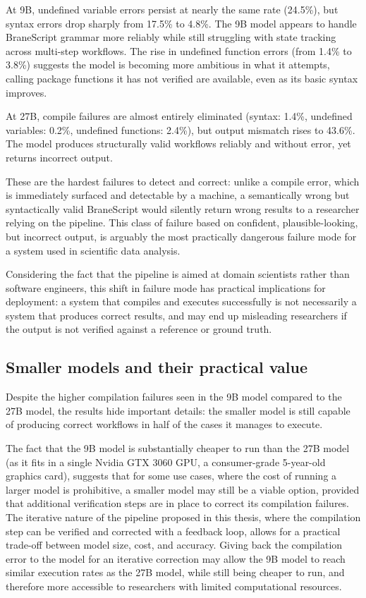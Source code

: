 At 9B, undefined variable errors persist at nearly the same rate (24.5\%),
but syntax errors drop sharply from 17.5\% to 4.8\%. The 9B model appears to
handle BraneScript grammar more reliably while still struggling with state
tracking across multi-step workflows. The rise in undefined function errors
(from 1.4\% to 3.8\%) suggests the model is becoming more ambitious in what
it attempts, calling package functions it has not verified are available,
even as its basic syntax improves.

At 27B, compile failures are almost entirely eliminated (syntax: 1.4\%,
undefined variables: 0.2\%, undefined functions: 2.4\%), but output mismatch
rises to 43.6\%. The model produces structurally valid workflows reliably and
without error, yet returns incorrect output. 

These are the hardest failures to detect and correct:
unlike a compile error, which is immediately surfaced and detectable by a machine, a
semantically wrong but syntactically valid BraneScript would silently return
wrong results to a researcher relying on the pipeline. This class of failure based on confident,
plausible-looking, but incorrect output, is arguably the
most practically dangerous failure mode for a system used in scientific data
analysis.

Considering the fact that the pipeline is aimed at domain scientists rather than 
software engineers, this shift in failure mode has practical implications for 
deployment: a system that compiles and executes successfully is not necessarily
a system that produces correct results, and may end up misleading researchers if
the output is not verified against a reference or ground truth.

\subsection{Smaller models and their practical value}
Despite the higher compilation failures seen in the 9B model compared to the 27B model,
the results hide important details: 
the smaller model is still capable of producing correct workflows in half of the cases it manages to execute.

The fact that the 9B model is substantially cheaper to run than the 27B model (as it fits
in a single Nvidia GTX 3060 GPU, a consumer-grade 5-year-old graphics card), 
suggests that for some use cases, where the cost of running a larger model is prohibitive,
a smaller model may still be a viable option, provided that additional verification 
steps are in place to correct its compilation failures.
The iterative nature of the pipeline proposed in this thesis, where the compilation step can be
verified and corrected with a feedback loop, allows for a practical trade-off between model size, cost, and accuracy.
Giving back the compilation error to the model for an iterative correction may allow the 9B model
to reach similar execution rates as the 27B model, while still being cheaper to run, and therefore 
more accessible to researchers with limited computational resources.
